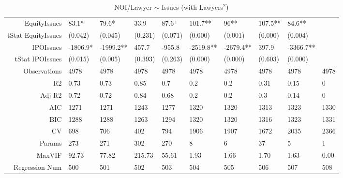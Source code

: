 \begin{table}[ht]
\begin{tabular}{rlllllllll}
  EquityIssues & 83.1* & 79.6* & 33.9 & 87.6$^{+}$ & 101.7** & 96** & 107.5** & 84.6** &  \\ 
  tStat EquityIssues & (0.042) & (0.045) & (0.231) & (0.071) & (0.000) & (0.001) & (0.000) & (0.004) &  \\ 
  IPOIssues & -1806.9* & -1999.2** & 457.7 & -955.8 & -2519.8** & -2679.4** & 397.9 & -3366.7** &  \\ 
  tStat IPOIssues & (0.015) & (0.005) & (0.393) & (0.263) & (0.000) & (0.000) & (0.603) & (0.000) &  \\ 
  Observations & 4978 & 4978 & 4978 & 4978 & 4978 & 4978 & 4978 & 4978 & 4978 \\ 
  R2 & 0.73 & 0.73 & 0.85 & 0.7 & 0.2 & 0.2 & 0.31 & 0.15 & 0 \\ 
  Adj R2 & 0.72 & 0.72 & 0.84 & 0.68 & 0.2 & 0.2 & 0.3 & 0.14 & 0 \\ 
  AIC & 1271 & 1271 & 1243 & 1277 & 1320 & 1320 & 1313 & 1323 & 1330 \\ 
  BIC & 1288 & 1288 & 1263 & 1294 & 1320 & 1320 & 1316 & 1323 & 1331 \\ 
  CV & 698 & 706 & 402 & 794 & 1906 & 1907 & 1672 & 2035 & 2366 \\ 
  Params & 273 & 271 & 302 & 270 & 8 & 6 & 37 & 5 & 1 \\ 
  MaxVIF & 92.73 & 77.82 & 215.73 & 55.61 & 1.93 & 1.66 & 1.70 & 1.63 & 0.00 \\ 
  Regression Num & 500 & 501 & 502 & 503 & 504 & 505 & 506 & 507 & 508 \\ 
   \hline
\end{tabular}
\caption{NOI/Lawyer $\sim$ Issues (with Lawyers$^2$)} 
\end{table}
